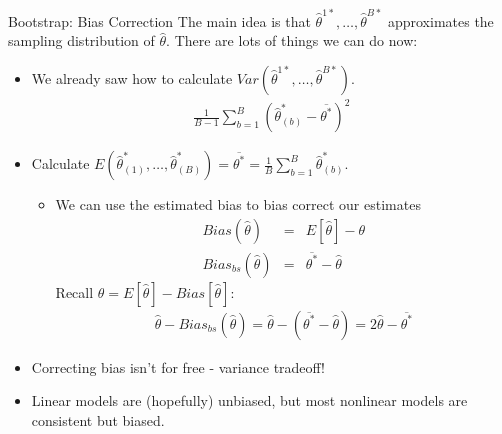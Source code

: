 \documentclass[11pt,handout,xcolor=pdftex,dvipsnames,table,mathserif,aspectratio=169]{beamer}
\begin{document}
\begin{frame}{Bootstrap: Bias Correction}
\small
The main idea is that $\hat{\theta}^{1*},\ldots, \hat{\theta}^{B*}$ approximates the \alert{sampling distribution} of $\hat{\theta}$. There are lots of things we can do now:
\begin{itemize}
\item We already saw how to calculate $Var(\hat{\theta}^{1*},\ldots, \hat{\theta}^{B*})$.
\begin{eqnarray*}
\frac{1}{B-1} \sum_{b=1}^B (\hat{\theta}_{(b)}^* - \overline{\theta^{*}})^2
\end{eqnarray*}

\item Calculate $E(\hat{\theta}^{*}_{(1)},\ldots, \hat{\theta}^{*}_{(B)}) = \overline{\theta^{*}} = \frac{1}{B} \sum_{b=1}^B \hat{\theta}_{(b)}^*$.
\begin{itemize}
\item We can use the estimated bias to \alert{bias correct} our estimates
\begin{eqnarray*}
Bias(\hat{\theta}) &=&E[\hat{\theta}] - \theta \\
Bias_{bs}(\hat{\theta}) &=&\overline{\theta^{*}} -\hat{\theta}
\end{eqnarray*}
Recall $\theta = E[\hat{\theta}] - Bias[\hat{\theta}]$:
\begin{eqnarray*}
\hat{\theta}- Bias_{bs}(\hat{\theta}) = \hat{\theta}-(\overline{\theta^{*}}-\hat{\theta}) = 2 \hat{\theta} - \overline{\theta^{*}}
\end{eqnarray*}
\end{itemize}
\item Correcting bias isn't for free - variance tradeoff!
\item Linear models are (hopefully) unbiased, but most nonlinear models are \alert{consistent but biased}.
\end{itemize}

\end{frame}
\end{document}
